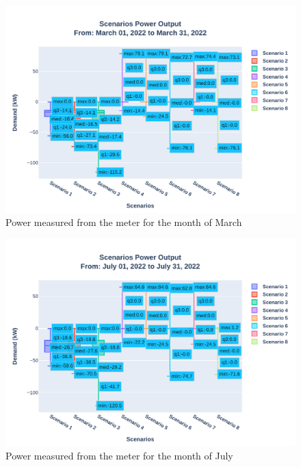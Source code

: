 \documentclass[conference]{IEEEtran}
\begin{document}
	\begin{figure}
		\centering
		\includegraphics[width=0.9\linewidth]{Fig/Option_3/0_Scn_Output_Run_3_Mar_01_2022_to_Mar_31_2022}
		\caption{\footnotesize  Power measured from the meter for the month of March}
		\label{fig:0scnoutputrun2mar012022tomar312022}
	\end{figure}
	\begin{figure}
		\centering
		\includegraphics[width=0.9\linewidth]{Fig/Option_3/4_Scn_Output_Run_3_Jul_01_2022_to_Jul_31_2022}
		\caption{\footnotesize  Power measured from the meter for the month of July}
		\label{fig:4scnoutputrun2jul012022tojul312022}
	\end{figure}
\end{document}
